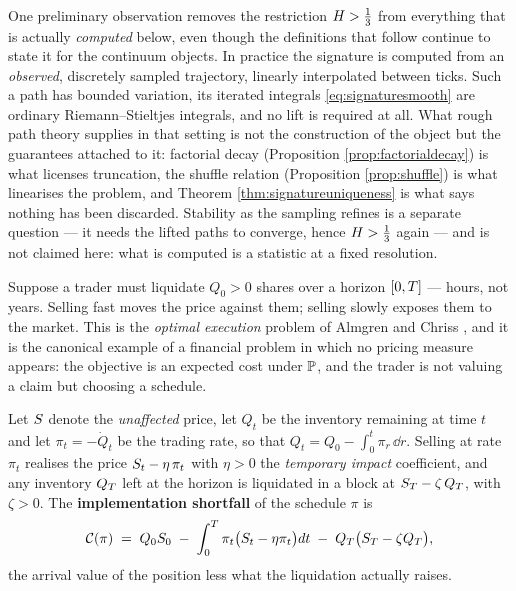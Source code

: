 \begin{remark}\label{rem:noliftneeded}
One preliminary observation removes the restriction $H>\tfrac13$ from everything that is
actually \emph{computed} below, even though the definitions that follow continue to state it for the
continuum objects. In practice
the signature is computed from an \emph{observed}, discretely sampled trajectory, linearly
interpolated between ticks. Such a path has bounded variation, its iterated integrals
\eqref{eq:signaturesmooth} are ordinary Riemann--Stieltjes integrals, and no lift is required at
all. What rough path theory supplies in that setting is not the construction of the object but the
guarantees attached to it: factorial decay (Proposition \ref{prop:factorialdecay}) is what licenses
truncation, the shuffle relation (Proposition \ref{prop:shuffle}) is what linearises the problem,
and Theorem \ref{thm:signatureuniqueness} is what says nothing has been discarded. Stability as the
sampling refines is a separate question --- it needs the lifted paths to converge, hence
$H>\tfrac13$ again --- and is not claimed here: what is computed is a statistic at a fixed
resolution.
\end{remark}


Suppose a trader must liquidate $Q_0>0$ shares over a horizon $[0,T]$ --- hours, not years. Selling fast
moves the price against them; selling slowly exposes them to the market. This is the
\emph{optimal execution} problem of Almgren and Chriss \cite{almgrenchriss2001}, and it is the
canonical example of a financial problem in which no pricing measure appears: the objective is an
expected cost under $\mathbb{P}$, and the trader is not valuing a claim but choosing a schedule.

\begin{definition}\label{def:execution}
Let $S$ denote the \emph{unaffected} price, let $Q_t$ be the inventory remaining at time $t$ and
let $\pi_t = -\dot Q_t$ be the trading rate, so that $Q_t = Q_0-\int_0^t\pi_r\,\dd r$. Selling at
rate $\pi_t$ realises the price $S_t-\eta\,\pi_t$ with $\eta>0$ the \emph{temporary impact}
coefficient, and any inventory $Q_T$ left at the horizon is liquidated in a block at
$S_T-\zeta\,Q_T$, with $\zeta>0$. The \textbf{implementation shortfall} of the schedule
$\pi$ is
\begin{equation}\label{eq:shortfalldef}
  \mathcal{C}(\pi) \;=\; Q_0S_0
  \;-\;\int_0^{T}\pi_t\bigl(S_t-\eta\pi_t\bigr)d t
  \;-\;Q_T\bigl(S_T-\zeta Q_T\bigr),
\end{equation}
the arrival value of the position less what the liquidation actually raises.
\end{definition}

